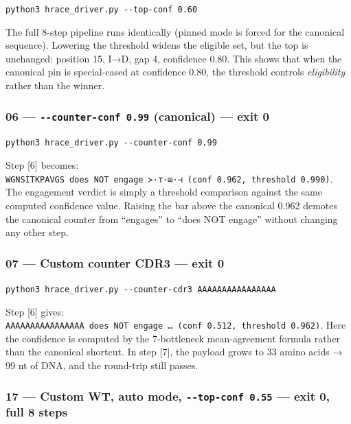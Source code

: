 \texttt{python3\ hrace\_driver.py\ -\/-top-conf\ 0.60}

The full 8-step pipeline runs identically (pinned mode is forced for the
canonical sequence). Lowering the threshold widens the eligible set, but
the top is unchanged: position 15, I→D, gap 4, confidence 0.80. This
shows that when the canonical pin is special-cased at confidence 0.80,
the threshold controls \emph{eligibility} rather than the winner.

\hypertarget{counter-conf-0.99-canonical-exit-0}{%
\subsubsection{\texorpdfstring{06 --- \texttt{-\/-counter-conf\ 0.99}
(canonical) --- exit
0}{06 --- -\/-counter-conf 0.99 (canonical) --- exit 0}}\label{counter-conf-0.99-canonical-exit-0}}

\texttt{python3\ hrace\_driver.py\ -\/-counter-conf\ 0.99}

Step {[}6{]} becomes:
\texttt{WGNSITKPAVGS\ does\ NOT\ engage\ ≻·⊤·⊞·⊣\ (conf\ 0.962,\ threshold\ 0.990)}.
The engagement verdict is simply a threshold comparison against the same
computed confidence value. Raising the bar above the canonical 0.962
demotes the canonical counter from ``engages'' to ``does NOT engage''
without changing any other step.

\hypertarget{custom-counter-cdr3-exit-0}{%
\subsubsection{07 --- Custom counter CDR3 --- exit
0}\label{custom-counter-cdr3-exit-0}}

\texttt{python3\ hrace\_driver.py\ -\/-counter-cdr3\ AAAAAAAAAAAAAAAA}

Step {[}6{]} gives:
\texttt{AAAAAAAAAAAAAAAA\ does\ NOT\ engage\ \ldots{}\ (conf\ 0.512,\ threshold\ 0.962)}.
Here the confidence is computed by the 7-bottleneck mean-agreement
formula rather than the canonical shortcut. In step {[}7{]}, the payload
grows to 33 amino acids → 99 nt of DNA, and the round-trip still passes.

\hypertarget{custom-wt-auto-mode---top-conf-0.55-exit-0-full-8-steps}{%
\subsubsection{\texorpdfstring{17 --- Custom WT, auto mode,
\texttt{-\/-top-conf\ 0.55} --- exit 0, full 8
steps}{17 --- Custom WT, auto mode, -\/-top-conf 0.55 --- exit 0, full 8 steps}}\label{custom-wt-auto-mode---top-conf-0.55-exit-0-full-8-steps}}

